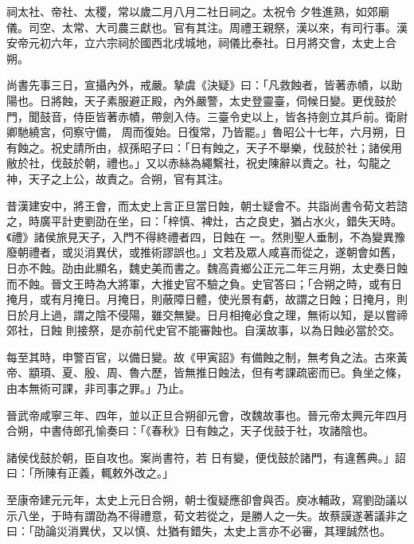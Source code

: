\begin{pinyinscope}
 祠太社、帝社、太稷，常以歲二月八月二社日祠之。太祝令
 夕牲進熟，如郊廟儀。司空、太常、大司農三獻也。官有其注。周禮王親祭，漢以來，有司行事。漢安帝元初六年，立六宗祠於國西北戌城地，祠儀比泰社。日月將交會，太史上合朔。



 尚書先事三日，宣攝內外，戒嚴。摯虞《決疑》曰：「凡救蝕者，皆著赤幘，以助陽也。日將蝕，天子素服避正殿，內外嚴警，太史登靈臺，伺候日變。更伐鼓於門，聞鼓音，侍臣皆著赤幘，帶劍入侍。三臺令史以上，皆各持劍立其戶前。衛尉卿馳繞宮，伺察守備，
 周而復始。日復常，乃皆罷。」魯昭公十七年，六月朔，日有蝕之。祝史請所由，叔孫昭子曰：「日有蝕之，天子不舉樂，伐鼓於社；諸侯用敝於社，伐鼓於朝，禮也。」又以赤絲為繩繫社，祝史陳辭以責之。社，勾龍之神，天子之上公，故責之。合朔，官有其注。



 昔漢建安中，將王會，而太史上言正旦當日蝕，朝士疑會不。共詣尚書令荀文若諮之，時廣平計吏劉劭在坐，曰：「梓慎、裨灶，古之良史，猶占水火，錯失天時。《禮》諸侯旅見天子，入門不得終禮者四，日蝕在
 一。然則聖人垂制，不為變異豫廢朝禮者，或災消異伏，或推術謬誤也。」文若及眾人咸喜而從之，遂朝會如舊，日亦不蝕。劭由此顯名，魏史美而書之。魏高貴鄉公正元二年三月朔，太史奏日蝕而不蝕。晉文王時為大將軍，大推史官不驗之負。史官答曰；「合朔之時，或有日掩月，或有月掩日。月掩日，則蔽障日體，使光景有虧，故謂之日蝕；日掩月，則日於月上過，謂之陰不侵陽，雖交無變。日月相掩必食之理，無術以知，是以嘗禘郊社，日蝕
 則接祭，是亦前代史官不能審蝕也。自漢故事，以為日蝕必當於交。



 每至其時，申警百官，以備日變。故《甲寅詔》有備蝕之制，無考負之法。古來黃帝、顓頊、夏、殷、周、魯六歷，皆無推日蝕法，但有考課疏密而已。負坐之條，由本無術可課，非司事之罪。」乃止。



 晉武帝咸寧三年、四年，並以正旦合朔卻元會，改魏故事也。晉元帝太興元年四月合朔，中書侍郎孔愉奏曰：「《春秋》日有蝕之，天子伐鼓于社，攻諸陰也。



 諸侯伐鼓於朝，臣自攻也。案尚書符，若
 日有變，便伐鼓於諸門，有違舊典。」詔曰：「所陳有正義，輒敕外改之。」



 至康帝建元元年，太史上元日合朔，朝士復疑應卻會與否。庾冰輔政，寫劉劭議以示八坐，于時有謂劭為不得禮意，荀文若從之，是勝人之一失。故蔡謨遂著議非之曰：「劭論災消異伏，又以慎、灶猶有錯失，太史上言亦不必審，其理誠然也。




\end{pinyinscope}
